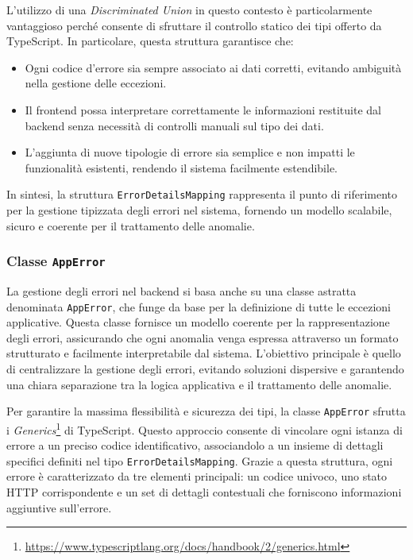 L'utilizzo di una \textit{Discriminated Union} in questo contesto è particolarmente vantaggioso perché consente di sfruttare il controllo statico dei tipi offerto da TypeScript. In particolare, questa struttura garantisce che:
\begin{itemize}
  \item Ogni codice d’errore sia sempre associato ai dati corretti, evitando ambiguità nella gestione delle eccezioni.
  \item Il frontend possa interpretare correttamente le informazioni restituite dal backend senza necessità di controlli manuali sul tipo dei dati.
  \item L’aggiunta di nuove tipologie di errore sia semplice e non impatti le funzionalità esistenti, rendendo il sistema facilmente estendibile.
\end{itemize}

In sintesi, la struttura \texttt{ErrorDetailsMapping} rappresenta il punto di riferimento per la gestione tipizzata degli errori nel sistema, fornendo un modello scalabile, sicuro e coerente per il trattamento delle anomalie.

\subsubsection{Classe \texttt{AppError}}
La gestione degli errori nel backend si basa anche su una classe astratta denominata \texttt{AppError}, che funge da base per la definizione di tutte le eccezioni applicative. Questa classe fornisce un modello coerente per la rappresentazione degli errori, assicurando che ogni anomalia venga espressa attraverso un formato strutturato e facilmente interpretabile dal sistema. L'obiettivo principale è quello di centralizzare la gestione degli errori, evitando soluzioni dispersive e garantendo una chiara separazione tra la logica applicativa e il trattamento delle anomalie.

Per garantire la massima flessibilità e sicurezza dei tipi, la classe \texttt{AppError} sfrutta i \textit{Generics}\footnote{\url{https://www.typescriptlang.org/docs/handbook/2/generics.html}} di TypeScript. Questo approccio consente di vincolare ogni istanza di errore a un preciso codice identificativo, associandolo a un insieme di dettagli specifici definiti nel tipo \texttt{ErrorDetailsMapping}. Grazie a questa struttura, ogni errore è caratterizzato da tre elementi principali: un codice univoco, uno stato HTTP corrispondente e un set di dettagli contestuali che forniscono informazioni aggiuntive sull'errore.

